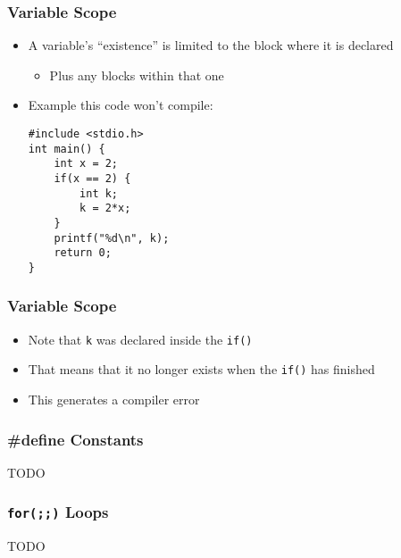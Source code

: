 \documentclass[14pt]{beamer}
\begin{document}
\begin{frame}[fragile]
\frametitle{Variable Scope}
\begin{itemize}
\item A variable's ``existence'' is limited to the block where it is declared
	\begin{itemize}
		\item Plus any blocks within that one
	\end{itemize}
\item Example this code won't compile:
\begin{lstlisting}[style=CStyle]
#include <stdio.h>
int main() {
	int x = 2;
	if(x == 2) {
		int k;
		k = 2*x;
	}
	printf("%d\n", k);
	return 0;
}
\end{lstlisting}
\end{itemize}
\end{frame}

\begin{frame}
\frametitle{Variable Scope}
\begin{itemize}
\item Note that \texttt{k} was declared inside the \texttt{if()}
\item That means that it no longer exists when the \texttt{if()} has finished
\item This generates a compiler error
\end{itemize}
\end{frame}

\begin{frame}
\frametitle{\#define Constants}
TODO
\end{frame}

\begin{frame}
\frametitle{\texttt{for(;;)} Loops}
TODO
\end{frame}
\end{document}
